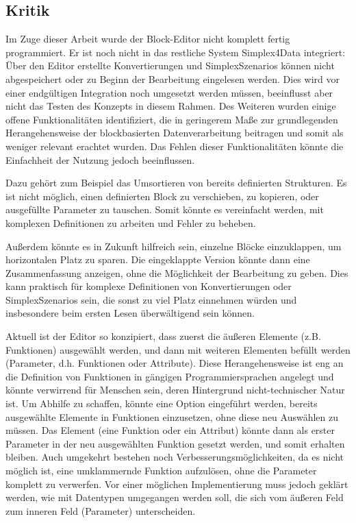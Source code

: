 \subsection{Kritik}
\label{sec:criticism}

Im Zuge dieser Arbeit wurde der Block-Editor nicht komplett fertig programmiert. Er ist noch nicht in das restliche System Simplex4Data integriert: Über den Editor erstellte Konvertierungen und SimplexSzenarios können nicht abgespeichert oder zu Beginn der Bearbeitung eingelesen werden. Dies wird vor einer endgültigen Integration noch umgesetzt werden müssen, beeinflusst aber nicht das Testen des Konzepts in diesem Rahmen. Des Weiteren wurden einige offene Funktionalitäten identifiziert, die in geringerem Maße zur grundlegenden Herangehensweise der blockbasierten Datenverarbeitung beitragen und somit als weniger relevant erachtet wurden. Das Fehlen dieser Funktionalitäten könnte die Einfachheit der Nutzung jedoch beeinflussen.

Dazu gehört zum Beispiel das Umsortieren von bereits definierten Strukturen. Es ist nicht möglich, einen definierten Block zu verschieben, zu kopieren, oder ausgefüllte Parameter zu tauschen. Somit könnte es vereinfacht werden, mit komplexen Definitionen zu arbeiten und Fehler zu beheben.

Außerdem könnte es in Zukunft hilfreich sein, einzelne Blöcke einzuklappen, um horizontalen Platz zu sparen. Die eingeklappte Version könnte dann eine Zusammenfassung anzeigen, ohne die Möglichkeit der Bearbeitung zu geben. Dies kann praktisch für komplexe Definitionen von Konvertierungen oder SimplexSzenarios sein, die sonst zu viel Platz einnehmen würden und insbesondere beim ersten Lesen überwältigend sein können.

Aktuell ist der Editor so konzipiert, dass zuerst die äußeren Elemente (z.B. Funktionen) ausgewählt werden, und dann mit weiteren Elementen befüllt werden (Parameter, d.h. Funktionen oder Attribute). Diese Herangehensweise ist eng an die Definition von Funktionen in gängigen Programmiersprachen angelegt und könnte verwirrend für Menschen sein, deren Hintergrund nicht-technischer Natur ist. Um Abhilfe zu schaffen, könnte eine Option eingeführt werden, bereits ausgewählte Elemente in Funktionen einzusetzen, ohne diese neu Auswählen zu müssen. Das Element (eine Funktion oder ein Attribut) könnte dann als erster Parameter in der neu ausgewählten Funktion gesetzt werden, und somit erhalten bleiben. Auch umgekehrt bestehen noch Verbesserungsmöglichkeiten, da es nicht möglich ist, eine umklammernde Funktion aufzulösen, ohne die Parameter komplett zu verwerfen. Vor einer möglichen Implementierung muss jedoch geklärt werden, wie mit Datentypen umgegangen werden soll, die sich vom äußeren Feld zum inneren Feld (Parameter) unterscheiden.

